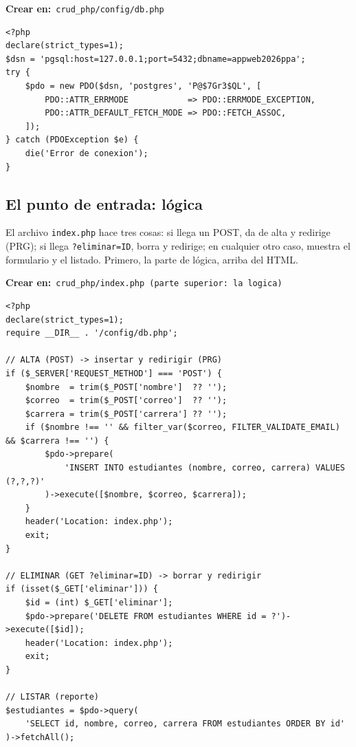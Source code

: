\documentclass[11pt]{article}
\begin{document}
{\small\color{phpazulo}\textbf{Crear en:}~}\texttt{crud\_php/\allowbreak{}config/\allowbreak{}db.\allowbreak{}php}\par\nobreak\vspace{-1pt}
\begin{cajacodigo}
\begin{lstlisting}[style=php]
<?php
declare(strict_types=1);
$dsn = 'pgsql:host=127.0.0.1;port=5432;dbname=appweb2026ppa';
try {
    $pdo = new PDO($dsn, 'postgres', 'P@$7Gr3$QL', [
        PDO::ATTR_ERRMODE            => PDO::ERRMODE_EXCEPTION,
        PDO::ATTR_DEFAULT_FETCH_MODE => PDO::FETCH_ASSOC,
    ]);
} catch (PDOException $e) {
    die('Error de conexion');
}
\end{lstlisting}
\end{cajacodigo}
\vspace{2pt}
\subsection{El punto de entrada: lógica}
El archivo \texttt{index.\allowbreak{}php} hace tres cosas: si llega un POST, da de alta y redirige (PRG); si llega \texttt{?\allowbreak{}eliminar=\allowbreak{}ID}, borra y redirige; en cualquier otro caso, muestra el formulario y el listado. Primero, la parte de lógica, arriba del HTML.

{\small\color{phpazulo}\textbf{Crear en:}~}\texttt{crud\_php/\allowbreak{}index.\allowbreak{}php  (parte superior:\allowbreak{} la logica)}\par\nobreak\vspace{-1pt}
\begin{cajacodigo}
\begin{lstlisting}[style=php]
<?php
declare(strict_types=1);
require __DIR__ . '/config/db.php';

// ALTA (POST) -> insertar y redirigir (PRG)
if ($_SERVER['REQUEST_METHOD'] === 'POST') {
    $nombre  = trim($_POST['nombre']  ?? '');
    $correo  = trim($_POST['correo']  ?? '');
    $carrera = trim($_POST['carrera'] ?? '');
    if ($nombre !== '' && filter_var($correo, FILTER_VALIDATE_EMAIL) && $carrera !== '') {
        $pdo->prepare(
            'INSERT INTO estudiantes (nombre, correo, carrera) VALUES (?,?,?)'
        )->execute([$nombre, $correo, $carrera]);
    }
    header('Location: index.php');
    exit;
}

// ELIMINAR (GET ?eliminar=ID) -> borrar y redirigir
if (isset($_GET['eliminar'])) {
    $id = (int) $_GET['eliminar'];
    $pdo->prepare('DELETE FROM estudiantes WHERE id = ?')->execute([$id]);
    header('Location: index.php');
    exit;
}

// LISTAR (reporte)
$estudiantes = $pdo->query(
    'SELECT id, nombre, correo, carrera FROM estudiantes ORDER BY id'
)->fetchAll();
\end{lstlisting}
\end{cajacodigo}
\vspace{2pt}
\end{document}
